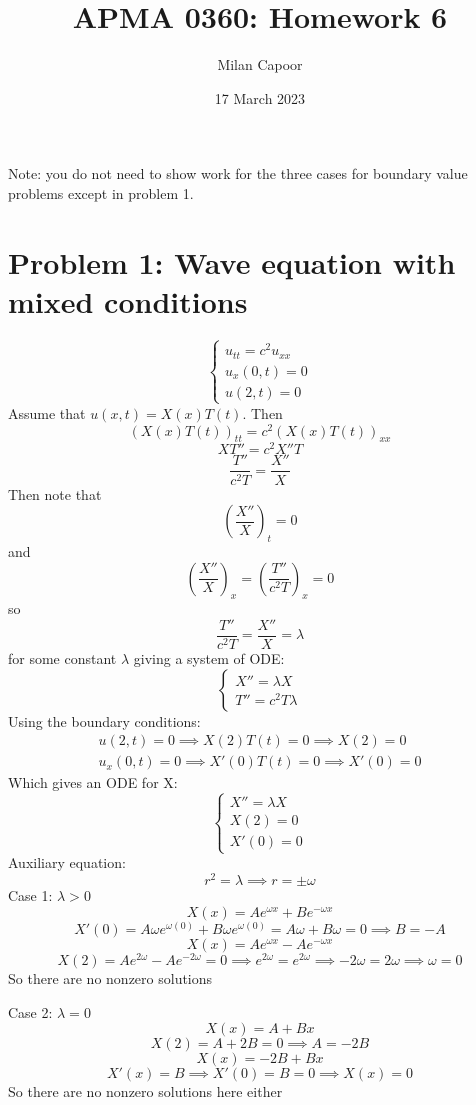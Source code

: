 \documentclass[12pt]{article}
\title{APMA 0360: Homework 6}
\author{Milan Capoor}
\date{17 March 2023}
\begin{document}
\maketitle
Note: you do not need to show work for the three cases for boundary value problems except in problem 1.

\section*{Problem 1: Wave equation with mixed conditions} 
\[\begin{cases}
    u_{tt}= c^2 u_{xx}\\
    u_x(0, t) = 0\\
    u(2, t) = 0
\end{cases}\]
\color{blue}
Assume that $u(x, t) = X(x)T(t)$. Then 
\[( X(x)T(t))_{tt} = c^2( X(x)T(t))_{xx}\]
\[XT'' = c^2X''T\]
\[\frac{T''}{c^2T} = \frac{X''}{X}\]
Then note that 
\[\left(\frac{X''}{X}\right)_t = 0\]
and 
\[\left(\frac{X''}{X}\right)_x = \left(\frac{T''}{c^2T}\right)_x = 0\]
so 
\[\frac{T''}{c^2T} = \frac{X''}{X} = \lambda\]
for some constant $\lambda$ giving a system of ODE:
\[\begin{cases}
    X'' = \lambda X\\
    T'' = c^2T\lambda
\end{cases}\]
Using the boundary conditions:
\begin{align*}
    u(2, t) = 0 \implies X(2)T(t) = 0 \implies X(2) = 0\\
    u_x(0, t) = 0 \implies X'(0)T(t) = 0 \implies X'(0) = 0
\end{align*}
Which gives an ODE for X:
\[\begin{cases}
    X'' = \lambda X\\
    X(2) = 0\\
    X'(0) = 0
\end{cases}\]
Auxiliary equation:
\[r^2 = \lambda \implies r = \pm \omega\]
Case 1: $\lambda > 0$
\[X(x) = Ae^{\omega x} + Be^{-\omega x}\]
\[X'(0) = A\omega e^{\omega (0)} + B\omega e^{\omega (0)} = A\omega + B\omega = 0 \implies B = -A\]
\[X(x) = Ae^{\omega x} - Ae^{-\omega x}\]
\[X(2) = Ae^{2\omega} - Ae^{-2\omega} = 0 \implies e^{2\omega} = e^{2\omega} \implies -2\omega = 2\omega \implies \omega = 0\]
So there are no nonzero solutions

Case 2: $\lambda = 0$
\[X(x) = A + Bx\]
\[X(2) = A + 2B = 0 \implies A = -2B\]
\[X(x) = -2B + Bx\]
\[X'(x) = B \implies X'(0) = B = 0 \implies X(x) = 0\]
So there are no nonzero solutions here either 
\end{document}
